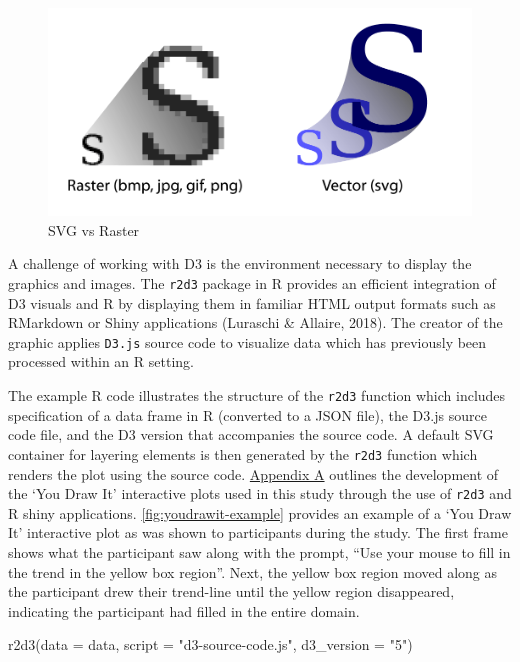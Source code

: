 \documentclass[print]{nuthesis}
\newenvironment{Shaded}{\begin{snugshade}}{\end{snugshade}}
\newcommand{\AttributeTok}[1]{\textcolor[rgb]{0.77,0.63,0.00}{#1}}
\newcommand{\FunctionTok}[1]{\textcolor[rgb]{0.00,0.00,0.00}{#1}}
\newcommand{\NormalTok}[1]{#1}
\newcommand{\StringTok}[1]{\textcolor[rgb]{0.31,0.60,0.02}{#1}}
\begin{document}
\begin{figure}[tbp]

{\centering \includegraphics[width=0.7\linewidth,]{images/02-you-draw-it/raster-vs-vector} 

}

\caption{SVG vs Raster}\label{fig:raster-vs-vector}
\end{figure}

A challenge of working with D3 is the environment necessary to display the graphics and images.
The \texttt{r2d3} package in R provides an efficient integration of D3 visuals and R by displaying them in familiar HTML output formats such as RMarkdown or Shiny applications (Luraschi \& Allaire, 2018).
The creator of the graphic applies \texttt{D3.js} source code to visualize data which has previously been processed within an R setting.

The example R code illustrates the structure of the \texttt{r2d3} function which includes specification of a data frame in R (converted to a JSON file), the D3.js source code file, and the D3 version that accompanies the source code.
A default SVG container for layering elements is then generated by the \texttt{r2d3} function which renders the plot using the source code.
\protect\hyperlink{youdrawit-with-shiny}{Appendix A} outlines the development of the `You Draw It' interactive plots used in this study through the use of \texttt{r2d3} and R shiny applications.
\cref{fig:youdrawit-example} provides an example of a `You Draw It' interactive plot as was shown to participants during the study.
The first frame shows what the participant saw along with the prompt, ``Use your mouse to fill in the trend in the yellow box region''.
Next, the yellow box region moved along as the participant drew their trend-line until the yellow region disappeared, indicating the participant had filled in the entire domain.

\begin{Shaded}
\begin{Highlighting}[]
\FunctionTok{r2d3}\NormalTok{(}\AttributeTok{data =}\NormalTok{ data, }\AttributeTok{script =} \StringTok{"d3{-}source{-}code.js"}\NormalTok{,}
    \AttributeTok{d3\_version =} \StringTok{"5"}\NormalTok{)}
\end{Highlighting}
\end{Shaded}
\end{document}
